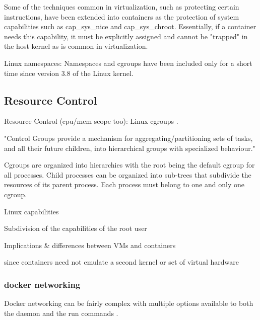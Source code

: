 Some of the techniques common in virtualization, such as protecting certain instructions, have been extended into containers as the protection of system capabilities such as cap\_sys\_nice and cap\_sys\_chroot.  
Essentially, if a container needs this capability, it must be explicitly assigned and cannot be "trapped" in the host kernel as is common in virtualization.

Linux namespaces: Namespaces and cgroups have been included only for a short time since version 3.8 of the Linux kernel.  


\subsection{Resource Control}
\label{sec:resource_control}
Resource Control (cpu/mem scope too): 
Linux cgroups \autocite{kernelcgroups}.

"Control Groups provide a mechanism for aggregating/partitioning sets of tasks, and all their future children, into hierarchical groups with specialized behaviour."

Cgroups are organized into hierarchies with the root being the default cgroup for all processes.  Child processes can be organized into sub-trees that subdivide the resources of its parent process.  Each process must belong to one and only one cgroup. 

Linux capabilities

Subdivision of the capabilities of the root user

Implications \& differences between VMs and containers

since containers need not emulate a second kernel or set of virtual hardware

\subsubsection{docker networking} %
\label{ssub:dockernetworking}

Docker networking can be fairly complex with multiple options available to both the daemon and the run commands \autocite{dockernetworking1}.

